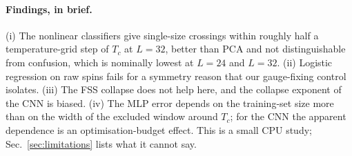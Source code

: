 \paragraph*{Findings, in brief.} (i) The nonlinear classifiers give single-size crossings within roughly half a temperature-grid step of $T_c$ at $L=32$, better than PCA and not distinguishable from confusion, which is nominally lowest at $L=24$ and $L=32$. (ii) Logistic regression on raw spins fails for a symmetry reason that our gauge-fixing control isolates. (iii) The FSS collapse does not help here, and the collapse exponent of the CNN is biased. (iv) The MLP error depends on the training-set size more than on the width of the excluded window around $T_c$; for the CNN the apparent dependence is an optimisation-budget effect. This is a small CPU study; Sec.~\ref{sec:limitations} lists what it cannot say.
